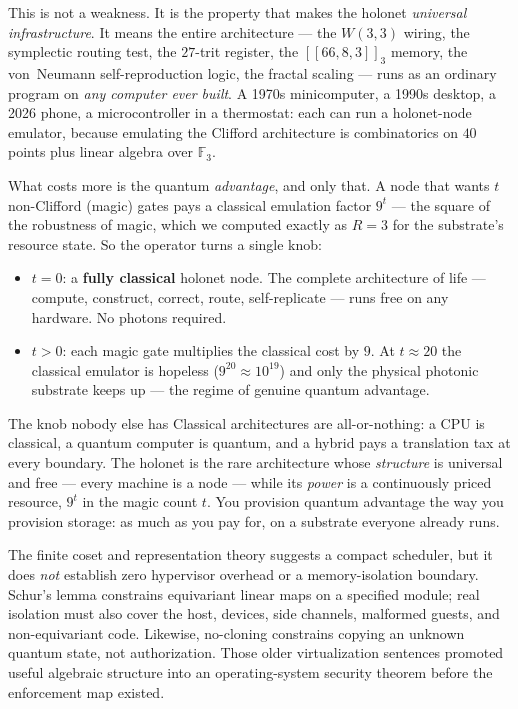 \documentclass[11pt]{article}
\begin{document}
This is not a weakness. It is the property that makes the holonet \emph{universal infrastructure}. It
means the entire architecture --- the $W(3,3)$ wiring, the symplectic routing test, the $27$-trit
register, the $[[66,8,3]]_3$ memory, the von~Neumann self-reproduction logic, the fractal scaling ---
runs as an ordinary program on \emph{any computer ever built}. A 1970s minicomputer, a 1990s desktop, a
2026 phone, a microcontroller in a thermostat: each can run a holonet-node emulator, because emulating
the Clifford architecture is combinatorics on $40$ points plus linear algebra over $\mathbb{F}_3$.

What costs more is the quantum \emph{advantage}, and only that. A node that wants $t$ non-Clifford
(magic) gates pays a classical emulation factor $9^{t}$ --- the square of the robustness of magic,
which we computed exactly as $R=3$ for the substrate's resource state. So the operator turns a single
knob:

\begin{itemize}[leftmargin=1.4em]
\item $t=0$: a \textbf{fully classical} holonet node. The complete architecture of life --- compute,
construct, correct, route, self-replicate --- runs free on any hardware. No photons required.
\item $t>0$: each magic gate multiplies the classical cost by $9$. At $t\approx 20$ the classical
emulator is hopeless ($9^{20}\approx 10^{19}$) and only the physical photonic substrate keeps up --- the
regime of genuine quantum advantage.
\end{itemize}

\begin{keybox}{The knob nobody else has}
Classical architectures are all-or-nothing: a CPU is classical, a quantum computer is quantum, and a
hybrid pays a translation tax at every boundary. The holonet is the rare architecture whose
\emph{structure} is universal and free --- every machine is a node --- while its \emph{power} is a
continuously priced resource, $9^t$ in the magic count $t$. You provision quantum advantage the way
you provision storage: as much as you pay for, on a substrate everyone already runs.
\end{keybox}

The finite coset and representation theory suggests a compact scheduler, but it does \emph{not}
establish zero hypervisor overhead or a memory-isolation boundary. Schur's lemma constrains
equivariant linear maps on a specified module; real isolation must also cover the host, devices,
side channels, malformed guests, and non-equivariant code. Likewise, no-cloning constrains copying an
unknown quantum state, not authorization. Those older virtualization sentences promoted useful
algebraic structure into an operating-system security theorem before the enforcement map existed.
\end{document}
